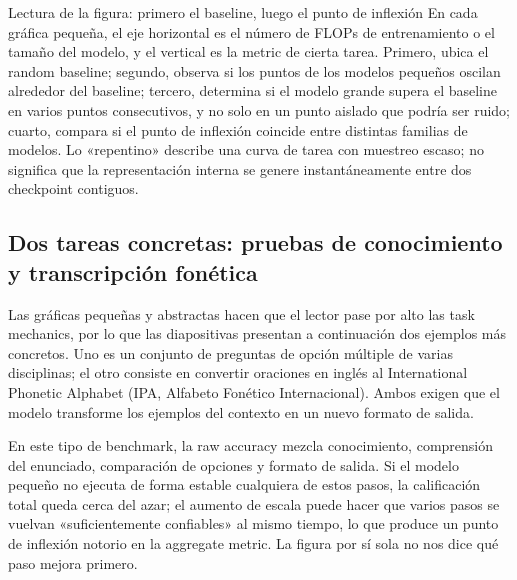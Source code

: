 
\begin{knowledgebox}{Lectura de la figura: primero el baseline, luego el punto de inflexión}
En cada gráfica pequeña, el eje horizontal es el número de FLOPs de entrenamiento o el tamaño del modelo, y el vertical es la metric de cierta tarea. Primero, ubica el random baseline; segundo, observa si los puntos de los modelos pequeños oscilan alrededor del baseline; tercero, determina si el modelo grande supera el baseline en varios puntos consecutivos, y no solo en un punto aislado que podría ser ruido; cuarto, compara si el punto de inflexión coincide entre distintas familias de modelos. Lo «repentino» describe una curva de tarea con muestreo escaso; no significa que la representación interna se genere instantáneamente entre dos checkpoint contiguos.
\end{knowledgebox}


\subsection{Dos tareas concretas: pruebas de conocimiento y transcripción fonética}

Las gráficas pequeñas y abstractas hacen que el lector pase por alto las task mechanics, por lo que las diapositivas presentan a continuación dos ejemplos más concretos. Uno es un conjunto de preguntas de opción múltiple de varias disciplinas; el otro consiste en convertir oraciones en inglés al International Phonetic Alphabet (IPA, Alfabeto Fonético Internacional). Ambos exigen que el modelo transforme los ejemplos del contexto en un nuevo formato de salida.


En este tipo de benchmark, la raw accuracy mezcla conocimiento, comprensión del enunciado, comparación de opciones y formato de salida. Si el modelo pequeño no ejecuta de forma estable cualquiera de estos pasos, la calificación total queda cerca del azar; el aumento de escala puede hacer que varios pasos se vuelvan «suficientemente confiables» al mismo tiempo, lo que produce un punto de inflexión notorio en la aggregate metric. La figura por sí sola no nos dice qué paso mejora primero.

